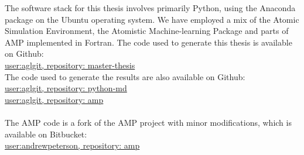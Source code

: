 The software stack for this thesis involves primarily Python,
using the Anaconda package on the Ubuntu operating system.
We have employed a mix of the Atomic Simulation Environment,
the Atomistic Machine-learning Package and parts of AMP implemented
in Fortran.
The code used to generate this thesis is available
on Github: \\
\href{https://github.com/aglgit/master-thesis}{
    user:aglgit, repository: master-thesis} \\
The code used to generate the results are also available
on Github: \\
\href{https://github.com/aglgit/python-md}{
    user:aglgit, repository: python-md} \\
\href{https://github.com/aglgit/amp}{
    user:aglgit, repository: amp} \\
\\
The AMP code is a fork of the AMP project with minor modifications,
which is available on Bitbucket: \\
\href{https://bitbucket.org/andrewpeterson/amp/src/master/}{
    user:andrewpeterson, repository: amp} \\

